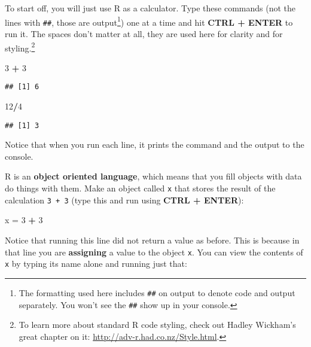 \documentclass[]{book}
\newenvironment{Shaded}{\begin{snugshade}}{\end{snugshade}}
\newcommand{\DecValTok}[1]{\textcolor[rgb]{0.00,0.00,0.81}{#1}}
\newcommand{\StringTok}[1]{\textcolor[rgb]{0.31,0.60,0.02}{#1}}
\newcommand{\OperatorTok}[1]{\textcolor[rgb]{0.81,0.36,0.00}{\textbf{#1}}}
\newcommand{\NormalTok}[1]{#1}
\let\rmarkdownfootnote\footnote%
\def\footnote{\protect\rmarkdownfootnote}
\theoremstyle{definition}
\theoremstyle{definition}
\theoremstyle{definition}
\theoremstyle{remark}
\begin{document}
To start off, you will just use R as a calculator. Type these commands
(not the lines with \texttt{\#\#}, those are output\footnote{The
  formatting used here includes \texttt{\#\#} on output to denote code
  and output separately. You won't see the \texttt{\#\#} show up in your
  console.}) one at a time and hit \textbf{CTRL + ENTER} to run it. The
spaces don't matter at all, they are used here for clarity and for
styling.\footnote{To learn more about standard R code styling, check out
  Hadley Wickham's great chapter on it:
  \url{http://adv-r.had.co.nz/Style.html}.}

\begin{Shaded}
\begin{Highlighting}[]
\DecValTok{3} \OperatorTok{+}\StringTok{ }\DecValTok{3}
\end{Highlighting}
\end{Shaded}

\begin{verbatim}
## [1] 6
\end{verbatim}

\begin{Shaded}
\begin{Highlighting}[]
\DecValTok{12}\OperatorTok{/}\DecValTok{4}
\end{Highlighting}
\end{Shaded}

\begin{verbatim}
## [1] 3
\end{verbatim}

Notice that when you run each line, it prints the command and the output
to the console.

R is an \textbf{object oriented language}, which means that you fill
objects with data do things with them. Make an object called \texttt{x}
that stores the result of the calculation \texttt{3\ +\ 3} (type this
and run using \textbf{CTRL + ENTER}):

\begin{Shaded}
\begin{Highlighting}[]
\NormalTok{x =}\StringTok{ }\DecValTok{3} \OperatorTok{+}\StringTok{ }\DecValTok{3}
\end{Highlighting}
\end{Shaded}

Notice that running this line did not return a value as before. This is
because in that line you are \textbf{assigning} a value to the object
\texttt{x}. You can view the contents of \texttt{x} by typing its name
alone and running just that:
\end{document}
